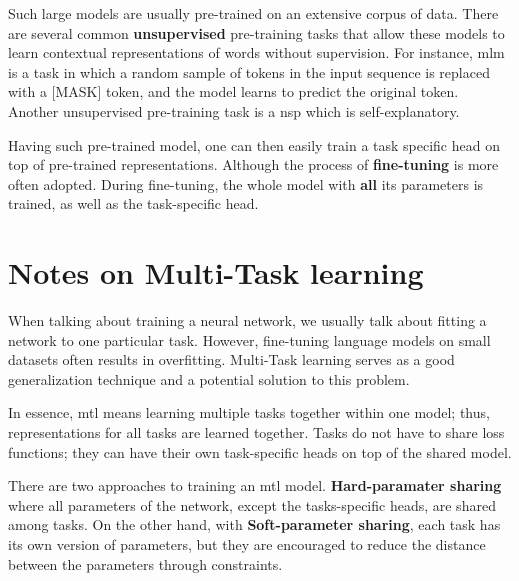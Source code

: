 Such large models are usually pre-trained on an extensive corpus of data. There are several common \textbf{unsupervised} pre-training tasks that allow these models to learn contextual representations of words without supervision. For instance, \gls{mlm} is a task in which a random sample of tokens in the input sequence is replaced with a [MASK] token, and the model learns to predict the original token. Another unsupervised pre-training task is a \gls{nsp} which is self-explanatory.

Having such pre-trained model, one can then easily train a task specific head on top of pre-trained representations. Although the process of \textbf{fine-tuning} is more often adopted. During fine-tuning, the whole model with \textbf{all} its parameters is trained, as well as the task-specific head.

\section{Notes on Multi-Task learning}
When talking about training a neural network, we usually talk about fitting a network to one particular task. However, fine-tuning language models on small datasets often results in overfitting. Multi-Task learning serves as a good generalization technique and a potential solution to this problem.

In essence, \gls{mtl} means learning multiple tasks together within one model; thus, representations for all tasks are learned together. Tasks do not have to share loss functions; they can have their own task-specific heads on top of the shared model.

There are two approaches to training an \gls{mtl} model.
\textbf{Hard-paramater sharing} where all parameters of the network, except the tasks-specific heads, are shared among tasks. On the other hand, with \textbf{Soft-parameter sharing}, each task has its own version of parameters, but they are encouraged to reduce the distance between the parameters through constraints.